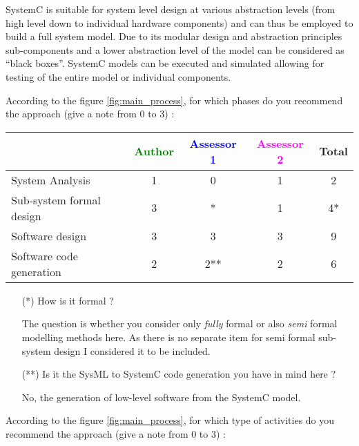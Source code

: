 SystemC is suitable for system level design at various abstraction levels (from high level down to individual hardware components) and can thus be employed to build a full system model. Due to its modular design and abstraction principles sub-components and a lower abstraction level of the model can be considered as ``black boxes''. SystemC models can be executed and simulated allowing for testing of the entire model or individual components.

According to the figure \ref{fig:main_process}, for which phases do you recommend the approach (give a note from 0 to 3) :

\begin{tabular}{|l | c | c | c | c|}
\hline
& \textcolor{green}{Author} & \textcolor{blue}{Assessor 1} & \textcolor{magenta}{Assessor 2} & Total \\
\hline
System Analysis &1 & 0 & 1 & 2 \\
\hline
Sub-system formal design & 3 & *  &  1 & 4* \\
\hline
Software design &3 &3 & 3 & 9 \\
\hline
Software code generation &2 & 2** & 2 & 6 \\
\hline
\end{tabular}
\begin{assessor1}
\begin{itemize}
\item[(*)] How is it formal ?
\begin{author_comment}
The question is whether you consider only \emph{fully} formal or also \emph{semi} formal modelling methods here. As there is no separate item for semi formal sub-system design I considered it to be included.
\end{author_comment}
\item[(**)] Is it the SysML to  SystemC code generation  you have in
  mind here ?
\begin{author_comment}
No, the generation of low-level software from the SystemC model.
\end{author_comment}
\end{itemize}
\end{assessor1}

According to the figure \ref{fig:main_process}, for which type of activities do you recommend the approach (give a note from 0 to 3) :

